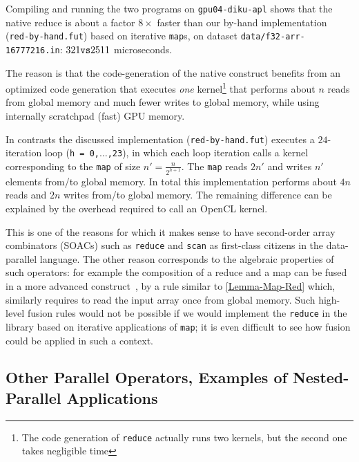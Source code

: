 \documentclass[acmsmall,review]{acmart}\settopmatter{printfolios=true,printccs=false,printacmref=false}
\begin{document}
Compiling and running the two programs on {\tt gpu04-diku-apl} 
shows that the native reduce is about a factor $8\times$ faster 
than our by-hand implementation ({\tt red-by-hand.fut}) based on
iterative \lstinline{map}s, on dataset {\tt data/f32-arr-16777216.in}:
 $321 \mbox{\tt vs} 2511$ microseconds.

The reason is that the code-generation of the native construct
benefits from an optimized code generation that executes \emph{one}
kernel\footnote{
The code generation of {\tt reduce} actually runs two kernels,
but the second one takes negligible time}
that performs about $n$ reads from global memory and much fewer 
writes to global memory, while using internally scratchpad (fast) 
GPU memory. 

In contrasts the discussed implementation ({\tt red-by-hand.fut})
executes a $24$-iteration loop ({\tt h = 0,$\ldots$,23}), in which 
each loop iteration calls a kernel corresponding to the \lstinline{map}
of size $n' = \frac{n}{2^{h+1}}$. The \lstinline{map} reads $2n'$ and 
writes $n'$ elements from/to global memory.
In total this implementation performs about $4 n$ reads and $2 n$ writes
from/to global memory.  The remaining difference can be explained 
by the overhead required to call an OpenCL kernel.

This is one of the reasons for which it makes sense to have second-order
array combinators (SOACs) such as \lstinline{reduce} and \lstinline{scan} as
first-class citizens in the data-parallel language. The other reason
corresponds to the algebraic properties of such operators: for example
the composition of a reduce and a map can be fused in a more
advanced construct~\cite{Futhark:redomap,Futhark:segredomap}, by a rule
similar to \cref{Lemma-Map-Red} which, similarly requires to read the 
input array once from global memory. 
Such high-level fusion rules would not be possible if we would implement
the {\tt reduce} in the library based on iterative applications of \lstinline{map};
it is even difficult to see how fusion could be applied in such a context.

\subsection{Other Parallel Operators, Examples of Nested-Parallel Applications}
\label{subsec:nest-par-app}
\end{document}
